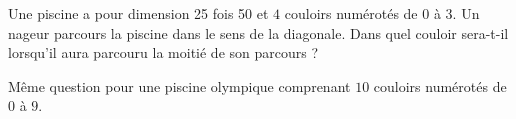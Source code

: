 
\begin{exercice}\label{exosmath-0479}

    Une piscine a pour dimension \unit{25}{\meter} fois \unit{50}{\meter} et \( 4\) couloirs numérotés de \( 0\) à \( 3\). Un nageur parcours la piscine dans le sens de la diagonale. Dans quel couloir sera-t-il lorsqu'il aura parcouru la moitié de son parcours ?

    Même question pour une piscine olympique comprenant \( 10\) couloirs numérotés de \( 0\) à \( 9\).

\end{exercice}
